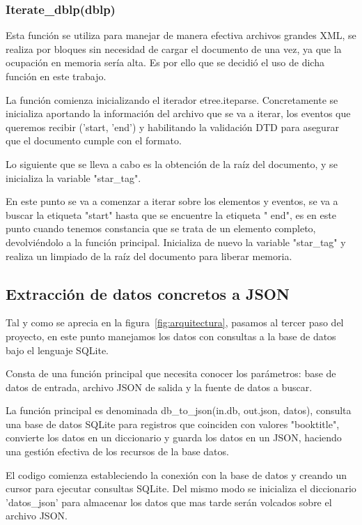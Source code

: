 \documentclass[a4paper, 12pt]{book}
\begin{document}
\subsubsection{Iterate\_dblp(dblp)}

Esta función se utiliza para manejar de manera efectiva archivos grandes XML, se realiza por bloques sin necesidad de cargar el documento de una vez, ya que la ocupación en memoria sería alta. Es por ello que se decidió el uso de dicha función en este trabajo.

La función comienza inicializando el iterador etree.iteparse. Concretamente se inicializa aportando la información del archivo que se va a iterar, los eventos que queremos recibir ('start, 'end') y habilitando la validación DTD para asegurar que el documento cumple con el formato.

Lo siguiente que se lleva a cabo es la obtención de la raíz del documento, y se inicializa la variable "star\_tag".

En este punto se va a comenzar a iterar sobre los elementos y eventos, se va a buscar la etiqueta "start" hasta que se encuentre la etiqueta " end", es en este punto cuando tenemos constancia que se trata de un elemento completo, devolviéndolo a la función principal. Inicializa de nuevo la variable "star\_tag" y realiza un limpiado de la raíz del documento para liberar memoria.


\subsection{Extracción de datos concretos a JSON}
Tal y como se aprecia en la figura~\ref{fig:arquitectura}, pasamos al tercer paso del proyecto, en este punto manejamos los datos con consultas a la base de datos bajo el lenguaje SQLite. 

Consta de una función principal que necesita conocer los parámetros: base de datos de entrada, archivo JSON de salida y la fuente de datos a buscar.

La función principal es denominada db\_to\_json(in.db, out.json, datos), consulta una base de datos SQLite para registros que coinciden con valores "booktitle", convierte los datos en un diccionario y guarda los datos en un JSON, haciendo una gestión efectiva de los recursos de la base datos.

El codigo comienza estableciendo la conexión con la base de datos y creando un cursor para ejecutar consultas SQLite. Del mismo modo se inicializa el diccionario 'datos\_json' para almacenar los datos que mas tarde serán volcados sobre el archivo JSON.
\end{document}
